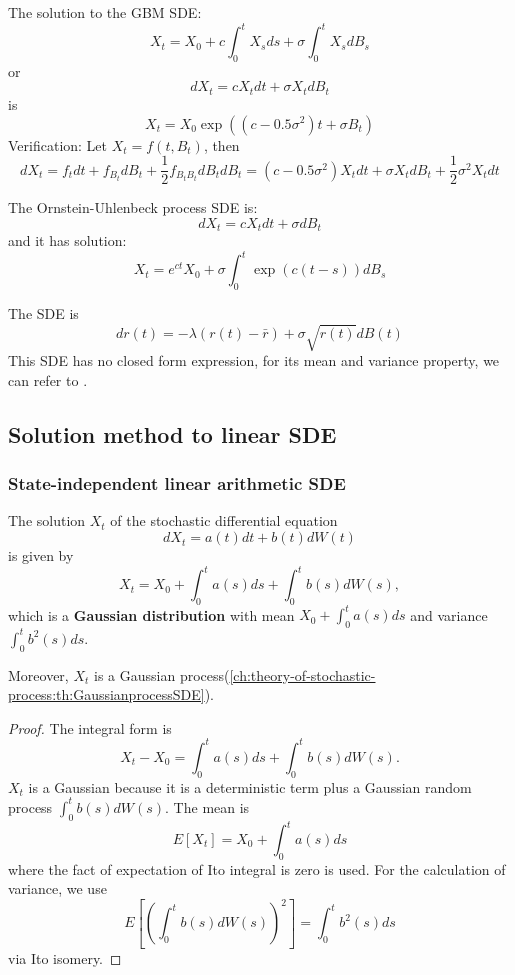 \begin{refsection}
\begin{example}
	The solution to the GBM SDE:
	$$X_t = X_0 + c\int_0^t X_s ds + \sigma \int_0^t X_sdB_s$$
	or
	$$dX_t = cX_tdt + \sigma X_t dB_t$$
	is 
	$$X_t = X_0 \exp((c-0.5\sigma^2)t + \sigma B_t)$$
	Verification: Let $X_t = f(t,B_t)$, then
	$$dX_t = f_tdt + f_{B_t}dB_t + \frac{1}{2}f_{B_tB_t}dB_tdB_t = (c-0.5\sigma^2)X_tdt + \sigma X_tdB_t + \frac{1}{2}\sigma^2X_tdt$$
\end{example}

\begin{example}
	\cite[141]{mikosch1998elementary} The Ornstein-Uhlenbeck process SDE is:
	$$dX_t = cX_tdt + \sigma dB_t$$
	and it has solution:
	$$X_t=e^{ct}X_0 + \sigma \int_0^t \exp(c(t-s))dB_s$$
\end{example}

\begin{example}\cite[112]{wiersema2008brownian}
	The SDE is $$dr(t)=-\lambda(r(t)-\bar{r}) + \sigma \sqrt{r(t)}dB(t)$$
	This SDE has no closed form expression, for its mean and variance property, we can refer to \cite[112]{wiersema2008brownian}.
\end{example}


\subsection{Solution method to linear SDE}
\subsubsection{State-independent linear arithmetic SDE}
\begin{lemma}\label{ch:theory-of-stochastic-process:th:arithmeticSDE}
	\cite[146]{calin2012introduction}\cite[116]{wiersema2008brownian}The solution $X_t$ of the stochastic differential equation $$dX_t = a(t)dt + b(t)dW(t)$$
	is given by
	$$X_t =  X_0 + \int_0^ta(s)ds + \int_0^tb(s)dW(s),$$
	which is a \textbf{Gaussian distribution} with mean $X_0+\int_0^ta(s)ds$ and variance $\int_0^t b^2(s)ds.$
	
	Moreover, $X_t$ is a Gaussian process(\autoref{ch:theory-of-stochastic-process:th:GaussianprocessSDE}). 
\end{lemma}
\begin{proof}
	The integral form is 
	$$X_t - X_0 = \int_0^ta(s)ds + \int_0^tb(s)dW(s).$$
	$X_t$ is a Gaussian because it is a deterministic term plus a Gaussian random process $\int_0^tb(s)dW(s)$. The mean is $$E[X_t] = X_0 + \int_0^ta(s)ds$$
	where the fact of expectation of Ito integral is zero is used.
	For the calculation of variance, we use
	$$E[(\int_0^tb(s)dW(s))^2]=\int_0^t b^2(s)ds$$
	via Ito isomery. 	
\end{proof}



\end{refsection}
